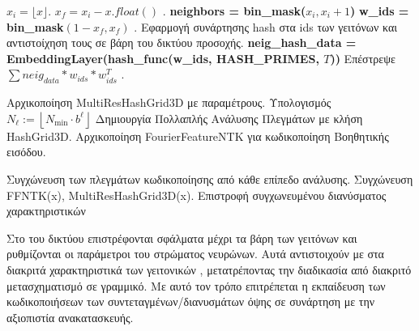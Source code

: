 \begin{appendices}
\begin{algorithm}[H]
\begin{algorithmic}
                \EndProcedure
                
                    \State $x_i = \lfloor x \rfloor$.
                    \State $x_f = x_i - x.float()$   .
                    \State \textbf{neighbors = bin\_mask($x_i, x_i + 1$)}
                    \State\textbf{w\_ids = bin\_mask$(1 - x_f, x_f)$} .
                    \State Εφαρμογή συνάρτησης hash στα ids των γειτόνων και αντιστοίχηση τους σε βάρη του δικτύου προσοχής.
                    \State \textbf{neig\_hash\_data = EmbeddingLayer(hash\_func(w\_ids, HASH\_PRIMES, $T$)) }
                    \State Επέστρεψε $\sum{neig_{data}*w_{ids}*w_{ids}^{T}}$ .
                \EndProcedure
                
                \State Αρχικοποίηση MultiResHashGrid3D με παραμέτρους.
                \State Υπολογισμός  $N_{\ell}:=\left\lfloor N_{\min }\cdot b^{\ell}\right\rfloor$
                \State Δημιουργία Πολλαπλής Ανάλυσης Πλεγμάτων με κλήση  HashGrid3D.
                   \State Αρχικοποίηση FourierFeatureNTK για κωδικοποίηση Βοηθητικής εισόδου.
                \EndIf
                \EndProcedure
                
               
                \State Συγχώνευση των πλεγμάτων κωδικοποίησης από κάθε επίπεδο ανάλυσης.
                 \State Συγχώνευση FFNTK(x), MultiResHashGrid3D(x).
                \EndIf
                \State Επιστροφή συγχωνευμένου διανύσματος χαρακτηριστικών
                \EndProcedure
            \end{algorithmic}
        \end{algorithm}
        Στο  του δικτύου επιστρέφονται σφάλματα μέχρι τα βάρη των γειτόνων και ρυθμίζονται οι παράμετροι του  στρώματος νευρώνων. Αυτά αντιστοιχούν με   στα διακριτά χαρακτηριστικά των γειτονικών , μετατρέποντας την διαδικασία από διακριτό μετασχηματισμό σε γραμμικό. Με αυτό τον τρόπο επιτρέπεται η εκπαίδευση των κωδικοποιήσεων των συντεταγμένων/διανυσμάτων όψης σε συνάρτηση με την αξιοπιστία  ανακατασκευής.

\end{appendices}
